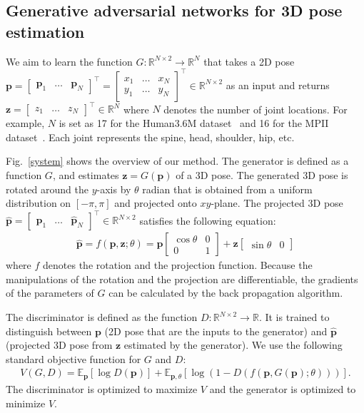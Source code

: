 \documentclass[runningheads]{llncs}
\newcommand{\Fref}[1]{Fig.~\ref{#1}}
\begin{document}
\subsection{Generative adversarial networks for 3D pose estimation}
We aim to learn the function $G: \mathbb{R}^{N \times 2} \rightarrow \mathbb{R}^N$ that takes a 2D pose 
${\bm p} =
\begin{bmatrix}
{\bm p}_1 & \dots & {\bm p}_N
\end{bmatrix}^{\top}=
\begin{bmatrix}
x_1 & \dots & x_N \\
y_1 & \dots & y_N
\end{bmatrix}^{\top}
\in \mathbb{R}^{N \times 2}$ 
as an input and returns 
${\bm z}=
\begin{bmatrix}
z_1 & \dots & z_N
\end{bmatrix}^{\top}
\in \mathbb{R}^N$ where $N$ denotes the number of joint locations.
For example, $N$ is set as 17 for the Human3.6M dataset~\cite{ionescu2014human3.6m} and 16 for the MPII dataset~\cite{mpii}. Each joint represents the spine, head, shoulder, hip, etc.

\Fref{system} shows the overview of our method. 
The generator is defined as a function $G$, and estimates ${\bm z}=G({\bm p})$ of a 3D pose.
The generated 3D pose is rotated around the $y$-axis by $\theta$ radian that is obtained from a uniform distribution on $[-\pi, \pi]$ and projected onto $xy$-plane.
The projected 3D pose 
$\hat{\bm p} =
\begin{bmatrix}
\hat{\bm p}_1 & \dots & \hat{\bm p}_N
\end{bmatrix}^{\top} \in \mathbb{R}^{N \times 2}$
satisfies the following equation:
\begin{eqnarray}
  \hat{\bm p} = 
  f({\bm p}, {\bm z}; \theta) = 
  {\bm p}
  \begin{bmatrix}
  \cos \theta & 0 \\
  0 & 1
  \end{bmatrix}
  + {\bm z}
  \begin{bmatrix}
  \sin \theta & 0
  \end{bmatrix}
\end{eqnarray}
where $f$ denotes the rotation and the projection function. Because the manipulations of the rotation and the projection are differentiable, the gradients of the parameters of $G$ can be calculated by the back propagation algorithm.

The discriminator is defined as the function $D : \mathbb{R}^{N \times 2} \rightarrow \mathbb{R}$.
It is trained to distinguish between ${\bm p}$ (2D pose that are the inputs to the generator) and $\hat{\bm p}$ (projected 3D pose from ${\bm z}$ estimated by the generator).
We use the following standard objective function for $G$ and $D$:
\begin{eqnarray}
V(G, D) = \mathbb{E}_{\bm p}[\log D({\bm p})] + \mathbb{E}_{{\bm p}, \theta}[\log (1 - D(f({\bm p}, G({\bm p}); \theta)))].
\label{gan-objective}
\end{eqnarray}
The discriminator is optimized to maximize $V$ and the generator is optimized to minimize $V$.
\end{document}
